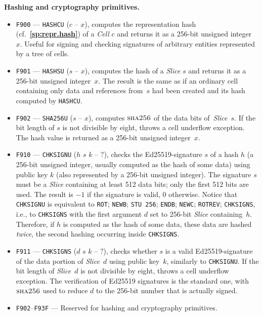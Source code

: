 \documentclass[12pt,oneside]{article}
\def\makepoint#1{\medbreak\noindent{\bf #1.\ }}
\def\nxsubpoint{\refstepcounter{subsubsection}%
  \smallbreak\makepoint{\thesubsubsection}}
\def\refpoint#1{{\rm\textbf{\ref{#1}}}}
\let\ptref=\refpoint
\def\emb#1{\textbf{#1.}}
\def\opsc#1{\operatorname{\textsc{#1}}}
\def\Sha{\opsc{sha256}}
\begin{document}
\nxsubpoint\emb{Hashing and cryptography primitives}
\begin{itemize}
\item {\tt F900} --- {\tt HASHCU} ($c$ -- $x$), computes the representation hash (cf.~\ptref{sp:repr.hash}) of a {\em Cell\/} $c$ and returns it as a 256-bit unsigned integer~$x$. Useful for signing and checking signatures of arbitrary entities represented by a tree of cells.
\item {\tt F901} --- {\tt HASHSU} ($s$ -- $x$), computes the hash of a {\em Slice\/} $s$ and returns it as a 256-bit unsigned integer~$x$. The result is the same as if an ordinary cell containing only data and references from~$s$ had been created and its hash computed by {\tt HASHCU}.
\item {\tt F902} --- {\tt SHA256U} ($s$ -- $x$), computes $\Sha$ of the data bits of~{\em Slice\/}~$s$. If the bit length of $s$ is not divisible by eight, throws a cell underflow exception. The hash value is returned as a 256-bit unsigned integer~$x$.
\item {\tt F910} --- {\tt CHKSIGNU} ($h$ $s$ $k$ -- $?$), checks the Ed25519-signature $s$ of a hash $h$ (a 256-bit unsigned integer, usually computed as the hash of some data) using public key $k$ (also represented by a 256-bit unsigned integer). The signature $s$ must be a {\em Slice\/} containing at least 512 data bits; only the first 512 bits are used. The result is $-1$ if the signature is valid, $0$ otherwise. Notice that {\tt CHKSIGNU} is equivalent to {\tt ROT}; {\tt NEWB}; {\tt STU 256}; {\tt ENDB}; {\tt NEWC}; {\tt ROTREV}; {\tt CHKSIGNS}, i.e., to {\tt CHKSIGNS} with the first argument $d$ set to 256-bit {\em Slice} containing~$h$. Therefore, if $h$ is computed as the hash of some data, these data are hashed {\em twice}, the second hashing occurring inside {\tt CHKSIGNS}. 
\item {\tt F911} --- {\tt CHKSIGNS} ($d$ $s$ $k$ -- $?$), checks whether $s$ is a valid Ed25519-signature of the data portion of {\em Slice\/}~$d$ using public key~$k$, similarly to {\tt CHKSIGNU}. If the bit length of {\em Slice\/}~$d$ is not divisible by eight, throws a cell underflow exception. The verification of Ed25519 signatures is the standard one, with $\Sha$ used to reduce $d$ to the 256-bit number that is actually signed. 
\item {\tt F902}--{\tt F93F} --- Reserved for hashing and cryptography primitives.
\end{itemize}
\end{document}
